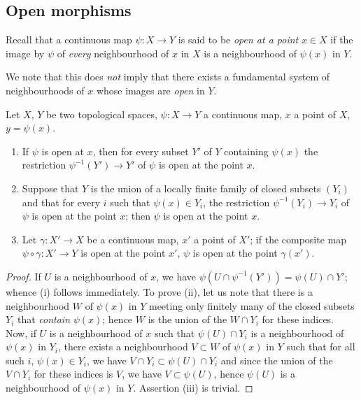 \subsection{Open morphisms}
\label{subsection:IV.14.1}

\begin{env}[14.1.1]
\label{IV.14.1.1}
Recall  that a continuous map $\psi:X\to Y$ is said to be \emph{open at a point} $x\in X$ if the image by $\psi$ of \emph{every} neighbourhood of $x$ in $X$ is a neighbourhood of $\psi(x)$ in $Y$.

We note that this does \emph{not} imply that there exists a fundamental system of neighbourhoods of $x$ whose images are \emph{open} in $Y$.
\end{env}

\begin{proposition}[14.1.2]
\label{IV.14.1.2}
Let $X$, $Y$ be two topological spaces, $\psi:X\to Y$ a continuous map, $x$ a point of $X$, $y=\psi(x)$.
\begin{enumerate}[label=(\roman*)]
  \item If $\psi$ is open at $x$, then for every subset $Y'$ of $Y$ containing $\psi(x)$ the restriction $\psi^{-1}(Y')\to Y'$ of $\psi$ is open at the point $x$.
  \item Suppose that $Y$ is the union of a locally finite family of closed subsets $(Y_i)$ and that for every $i$ such that $\psi(x)\in Y_i$, the restriction $\psi^{-1}(Y_i)\to Y_i$ of $\psi$ is open at the point $x$; then $\psi$ is open at the point $x$.
  \item Let $\gamma:X'\to X$ be a continuous map, $x'$ a point of $X'$; if the composite map $\psi\circ\gamma:X'\to Y$ is open at the point $x'$, $\psi$ is open at the point $\gamma(x')$.
\end{enumerate}
\end{proposition}

\begin{proof}
If $U$ is a neighbourhood of $x$, we have $\psi(U\cap\psi^{-1}(Y'))=\psi(U)\cap Y'$; whence (i) follows immediately.
To prove (ii), let us note that there is a neighbourhood $W$ of $\psi(x)$ in $Y$ meeting only finitely many of the closed subsets $Y_i$ that \emph{contain} $\psi(x)$; hence $W$ is the union of the $W\cap Y_i$ for these indices.
Now, if $U$ is a neighbourhood of $x$ such that $\psi(U)\cap Y_i$ is a neighbourhood of $\psi(x)$ in $Y_i$, there exists a neighbourhood $V\subset W$ of $\psi(x)$ in $Y$ such that for all such $i$, $\psi(x)\in Y_i$,
we have $V\cap Y_i\subset\psi(U)\cap Y_i$ and since the union of the $V\cap Y_i$ for these indices is $V$, we have $V\subset\psi(U)$, hence $\psi(U)$ is a neighbourhood of $\psi(x)$ in $Y$.
Assertion (iii) is trivial.
\end{proof}

